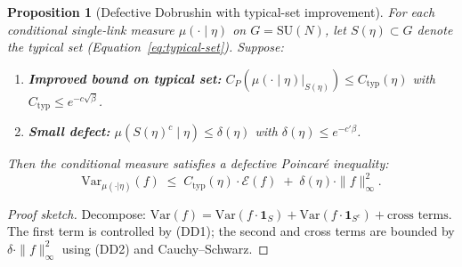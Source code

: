 \documentclass[12pt,a4paper]{article}
\theoremstyle{definition}
\theoremstyle{plain}
\newtheorem{proposition}[definition]{Proposition}
\theoremstyle{remark}
\begin{document}

\begin{proposition}[Defective Dobrushin with typical-set improvement]\label{prop:defective-dobrushin}
For each conditional single-link measure $\mu(\cdot \mid \eta)$ on $G = \mathrm{SU}(N)$, let $S(\eta) \subset G$ denote the typical set (Equation~\ref{eq:typical-set}). Suppose:
\begin{enumerate}
\item[\textup{(DD1)}] \textbf{Improved bound on typical set:} $C_P(\mu(\cdot \mid \eta)|_{S(\eta)}) \leq C_{\mathrm{typ}}(\eta)$ with $C_{\mathrm{typ}} \leq e^{-c\sqrt{\beta}}$.
\item[\textup{(DD2)}] \textbf{Small defect:} $\mu(S(\eta)^c \mid \eta) \leq \delta(\eta)$ with $\delta(\eta) \leq e^{-c'\beta}$.
\end{enumerate}
Then the conditional measure satisfies a \emph{defective Poincar\'e inequality}:
\begin{equation}\label{eq:defective-poincare}
  \mathrm{Var}_{\mu(\cdot|\eta)}(f) \;\leq\; C_{\mathrm{typ}}(\eta) \cdot \mathcal{E}(f) \;+\; \delta(\eta) \cdot \|f\|_\infty^2.
\end{equation}
\end{proposition}

\begin{proof}[Proof sketch]
Decompose: $\mathrm{Var}(f) = \mathrm{Var}(f \cdot \mathbf{1}_S) + \mathrm{Var}(f \cdot \mathbf{1}_{S^c}) + \text{cross terms}$. The first term is controlled by (DD1); the second and cross terms are bounded by $\delta \cdot \|f\|_\infty^2$ using (DD2) and Cauchy--Schwarz.
\end{proof}
\end{document}
